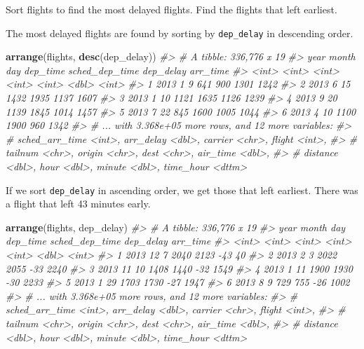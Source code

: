\documentclass[]{book}
\newenvironment{Shaded}{\begin{snugshade}}{\end{snugshade}}
\newcommand{\CommentTok}[1]{\textcolor[rgb]{0.56,0.35,0.01}{\textit{#1}}}
\newcommand{\KeywordTok}[1]{\textcolor[rgb]{0.13,0.29,0.53}{\textbf{#1}}}
\newcommand{\NormalTok}[1]{#1}
\theoremstyle{plain}
\theoremstyle{remark}
\begin{document}
Sort flights to find the most delayed flights. Find the flights that
left earliest.

The most delayed flights are found by sorting by \texttt{dep\_delay} in
descending order.

\begin{Shaded}
\begin{Highlighting}[]
\KeywordTok{arrange}\NormalTok{(flights, }\KeywordTok{desc}\NormalTok{(dep_delay))}
\CommentTok{#> # A tibble: 336,776 x 19}
\CommentTok{#>    year month   day dep_time sched_dep_time dep_delay arr_time}
\CommentTok{#>   <int> <int> <int>    <int>          <int>     <dbl>    <int>}
\CommentTok{#> 1  2013     1     9      641            900      1301     1242}
\CommentTok{#> 2  2013     6    15     1432           1935      1137     1607}
\CommentTok{#> 3  2013     1    10     1121           1635      1126     1239}
\CommentTok{#> 4  2013     9    20     1139           1845      1014     1457}
\CommentTok{#> 5  2013     7    22      845           1600      1005     1044}
\CommentTok{#> 6  2013     4    10     1100           1900       960     1342}
\CommentTok{#> # ... with 3.368e+05 more rows, and 12 more variables:}
\CommentTok{#> #   sched_arr_time <int>, arr_delay <dbl>, carrier <chr>, flight <int>,}
\CommentTok{#> #   tailnum <chr>, origin <chr>, dest <chr>, air_time <dbl>,}
\CommentTok{#> #   distance <dbl>, hour <dbl>, minute <dbl>, time_hour <dttm>}
\end{Highlighting}
\end{Shaded}

If we sort \texttt{dep\_delay} in ascending order, we get those that
left earliest. There was a flight that left 43 minutes early.

\begin{Shaded}
\begin{Highlighting}[]
\KeywordTok{arrange}\NormalTok{(flights, dep_delay)}
\CommentTok{#> # A tibble: 336,776 x 19}
\CommentTok{#>    year month   day dep_time sched_dep_time dep_delay arr_time}
\CommentTok{#>   <int> <int> <int>    <int>          <int>     <dbl>    <int>}
\CommentTok{#> 1  2013    12     7     2040           2123       -43       40}
\CommentTok{#> 2  2013     2     3     2022           2055       -33     2240}
\CommentTok{#> 3  2013    11    10     1408           1440       -32     1549}
\CommentTok{#> 4  2013     1    11     1900           1930       -30     2233}
\CommentTok{#> 5  2013     1    29     1703           1730       -27     1947}
\CommentTok{#> 6  2013     8     9      729            755       -26     1002}
\CommentTok{#> # ... with 3.368e+05 more rows, and 12 more variables:}
\CommentTok{#> #   sched_arr_time <int>, arr_delay <dbl>, carrier <chr>, flight <int>,}
\CommentTok{#> #   tailnum <chr>, origin <chr>, dest <chr>, air_time <dbl>,}
\CommentTok{#> #   distance <dbl>, hour <dbl>, minute <dbl>, time_hour <dttm>}
\end{Highlighting}
\end{Shaded}
\end{document}
